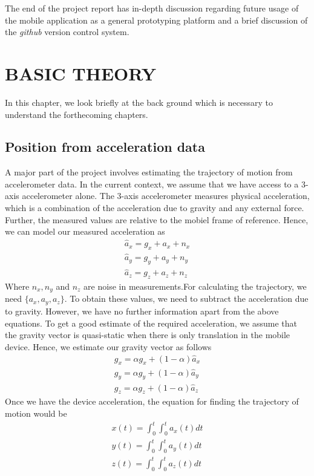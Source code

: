 \documentclass[BTech]{iitmdiss}
\begin{document}
The end of the project report has in-depth discussion regarding future
usage of the mobile application as a general prototyping platform and a
brief discussion of the \emph{github} version control system.

\chapter{BASIC THEORY}
\label{chap:basic_theory}
In this chapter, we look briefly at the back ground which is necessary 
to understand the forthecoming chapters. 

\section{Position from acceleration data}
\label{basic_theory:accel}
A major part of the project involves estimating the trajectory of motion
from accelerometer data. In the current context, we assume that we have
access to a 3-axis accelerometer alone. The 3-axis accelerometer 
measures physical acceleration, which is a combination of the 
acceleration due to gravity and any external force. Further, the 
measured values are relative to the mobiel frame of reference. Hence, 
we can model our measured acceleration as
\begin{align*}
\hat{a}_x= g_x + a_x + n_x\\
\hat{a}_y= g_y + a_y + n_y\\
\hat{a}_z= g_z + a_z + n_z
\end{align*}
Where $n_x, n_y$ and $n_z$ are noise in measurements.For calculating
 the trajectory, we need $\{a_x,a_y,a_z\}$. To obtain 
these values, we need to subtract the acceleration due to gravity. 
However, we have no further information apart from the above equations.
To get a good estimate of the required acceleration, we assume that the
gravity vector is quasi-static when there is only translation in the 
mobile device. Hence, we estimate our gravity vector as follows
\begin{align*}
g_x= \alpha{g_x} + (1-\alpha)\hat{a}_x\\
g_y= \alpha{g_y} + (1-\alpha)\hat{a}_y\\
g_z= \alpha{g_z} + (1-\alpha)\hat{a}_z
\end{align*}
Once we have the device acceleration, the equation for finding the 
trajectory of motion would be
\begin{align*}
x(t)=\int_0^{t}\int_0^{t}{a_x(t)dt}\\
y(t)=\int_0^{t}\int_0^{t}{a_y(t)dt}\\
z(t)=\int_0^{t}\int_0^{t}{a_z(t)dt}
\end{align*}
\end{document}
